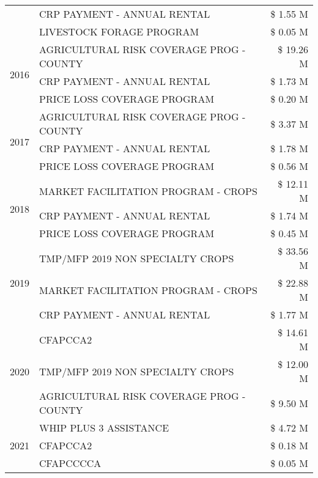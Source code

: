 \begin{tabular}{llr}
 & CRP PAYMENT - ANNUAL RENTAL & \$ 1.55 M \\
 & LIVESTOCK FORAGE PROGRAM & \$ 0.05 M \\
\cline{1-3}
\multirow[t]{3}{*}{2016} & AGRICULTURAL RISK COVERAGE PROG - COUNTY & \$ 19.26 M \\
 & CRP PAYMENT - ANNUAL RENTAL & \$ 1.73 M \\
 & PRICE LOSS COVERAGE PROGRAM & \$ 0.20 M \\
\cline{1-3}
\multirow[t]{3}{*}{2017} & AGRICULTURAL RISK COVERAGE PROG - COUNTY & \$ 3.37 M \\
 & CRP PAYMENT - ANNUAL RENTAL & \$ 1.78 M \\
 & PRICE LOSS COVERAGE PROGRAM & \$ 0.56 M \\
\cline{1-3}
\multirow[t]{3}{*}{2018} & MARKET FACILITATION PROGRAM - CROPS & \$ 12.11 M \\
 & CRP PAYMENT - ANNUAL RENTAL & \$ 1.74 M \\
 & PRICE LOSS COVERAGE PROGRAM & \$ 0.45 M \\
\cline{1-3}
\multirow[t]{3}{*}{2019} & TMP/MFP 2019 NON SPECIALTY CROPS & \$ 33.56 M \\
 & MARKET FACILITATION PROGRAM - CROPS & \$ 22.88 M \\
 & CRP PAYMENT - ANNUAL RENTAL & \$ 1.77 M \\
\cline{1-3}
\multirow[t]{3}{*}{2020} & CFAPCCA2 & \$ 14.61 M \\
 & TMP/MFP 2019 NON SPECIALTY CROPS & \$ 12.00 M \\
 & AGRICULTURAL RISK COVERAGE PROG - COUNTY & \$ 9.50 M \\
\cline{1-3}
\multirow[t]{3}{*}{2021} & WHIP PLUS 3 ASSISTANCE & \$ 4.72 M \\
 & CFAPCCA2 & \$ 0.18 M \\
 & CFAPCCCCA & \$ 0.05 M \\
\cline{1-3}
\bottomrule
\end{tabular}
